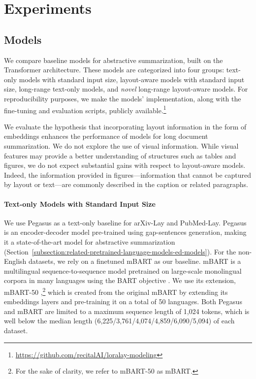 \section{Experiments}

\subsection{Models}

We compare baseline models for abstractive summarization, built on the Transformer architecture. These models are categorized into four groups: text-only models with standard input size, layout-aware models with standard input size, long-range text-only models, and \textit{novel} long-range layout-aware models. For reproducibility purposes, we make the models' implementation, along with the fine-tuning and evaluation scripts, publicly available.\footnote{\url{https://github.com/recitalAI/loralay-modeling}}

We evaluate the hypothesis that incorporating layout information in the form of embeddings enhances the performance of models for long document summarization. We do not explore the use of visual information. While visual features may provide a better understanding of structures such as tables and figures, we do not expect substantial gains with respect to layout-aware models. Indeed, the information provided in figures—information that cannot be captured by layout or text—are commonly described in the caption or related paragraphs. 

\paragraph{Text-only Models with Standard Input Size}

We use Pegasus \citep{zhang2020pegasus} as a text-only baseline for arXiv-Lay and PubMed-Lay. Pegasus is an encoder-decoder model pre-trained using gap-sentences generation, making it a state-of-the-art model for abstractive summarization (Section~\ref{subsection:related-pretrained-language-models-ed-models}).
For the non-English datasets, we rely on a finetuned mBART as our baseline. mBART \citep{liu2020multilingual} is a multilingual sequence-to-sequence model pretrained on large-scale monolingual corpora in many languages using the BART objective \citep{lewis2019bart}. We use its extension, mBART-50 \citep{tang2020multilingual},\footnote{For the sake of clarity, we refer to mBART-50 as mBART.} which is created from the original mBART by extending its embeddings layers and pre-training it on a total of 50 languages. Both Pegasus and mBART are limited to a maximum sequence length of 1,024 tokens, which is well below the median length (6,225/3,761/4,074/4,859/6,090/5,094) of each dataset.

